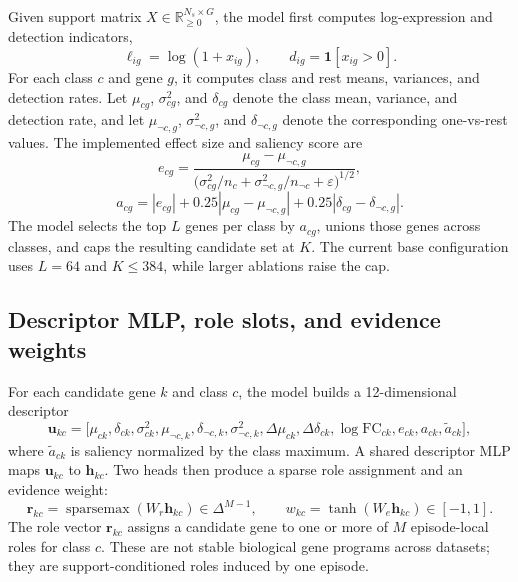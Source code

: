 \documentclass{article}
\newcommand{\R}{\mathbb{R}}
\newcommand{\eps}{\varepsilon}
\newcommand{\sparsemax}{\operatorname{sparsemax}}
\begin{document}
Given support matrix \(X\in\R_{\ge 0}^{N_s\times G}\), the model first computes log-expression and detection indicators,
\begin{equation}
    \ell_{ig}=\log(1+x_{ig}), \qquad d_{ig}=\mathbf{1}[x_{ig}>0].
\end{equation}
For each class \(c\) and gene \(g\), it computes class and rest means, variances, and detection rates. Let \(\mu_{cg}\), \(\sigma^2_{cg}\), and \(\delta_{cg}\) denote the class mean, variance, and detection rate, and let \(\mu_{\neg c,g}\), \(\sigma^2_{\neg c,g}\), and \(\delta_{\neg c,g}\) denote the corresponding one-vs-rest values. The implemented effect size and saliency score are
\begin{equation}
    e_{cg}=\frac{\mu_{cg}-\mu_{\neg c,g}}{\bigl(\sigma^2_{cg}/n_c+\sigma^2_{\neg c,g}/n_{\neg c}+\eps\bigr)^{1/2}},
\end{equation}
\begin{equation}
    a_{cg}=|e_{cg}|+0.25|\mu_{cg}-\mu_{\neg c,g}|+0.25|\delta_{cg}-\delta_{\neg c,g}|.
\end{equation}
The model selects the top \(L\) genes per class by \(a_{cg}\), unions those genes across classes, and caps the resulting candidate set at \(K\). The current base configuration uses \(L=64\) and \(K\le384\), while larger ablations raise the cap.

\subsection{Descriptor MLP, role slots, and evidence weights}

For each candidate gene \(k\) and class \(c\), the model builds a 12-dimensional descriptor
\begin{equation}
\mathbf{u}_{kc}=\bigl[\mu_{ck},\delta_{ck},\sigma^2_{ck},\mu_{\neg c,k},\delta_{\neg c,k},\sigma^2_{\neg c,k},
\Delta\mu_{ck},\Delta\delta_{ck},\log\mathrm{FC}_{ck},e_{ck},a_{ck},\tilde{a}_{ck}\bigr],
\end{equation}
where \(\tilde{a}_{ck}\) is saliency normalized by the class maximum. A shared descriptor MLP maps \(\mathbf{u}_{kc}\) to \(\mathbf{h}_{kc}\). Two heads then produce a sparse role assignment and an evidence weight:
\begin{equation}
    \mathbf{r}_{kc}=\sparsemax(W_r\mathbf{h}_{kc})\in\Delta^{M-1},
    \qquad
    w_{kc}=\tanh(W_e\mathbf{h}_{kc})\in[-1,1].
\end{equation}
The role vector \(\mathbf{r}_{kc}\) assigns a candidate gene to one or more of \(M\) episode-local roles for class \(c\). These are not stable biological gene programs across datasets; they are support-conditioned roles induced by one episode.
\end{document}
